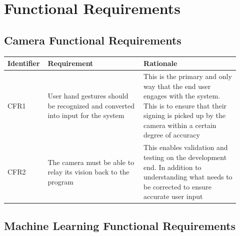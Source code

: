 \documentclass[12pt]{article}
\begin{document}
\section{Functional Requirements}
\subsection{Camera Functional Requirements}

\renewcommand{\arraystretch}{1.2}
\noindent \begin{tabularx}{\textwidth}{p{0.12\linewidth}|p{0.4\linewidth}|p{0.4\linewidth}}
\toprule
\textbf{Identifier} & \textbf{Requirement} & \textbf{Rationale}\\
\midrule
CFR1 
& User hand gestures should be recognized and converted into input for the system 
& This is the primary and only way that the end user engages with the system. This is to ensure that 
their signing is picked up by the camera within a certain degree of accuracy\\
\hline
CFR2
& The camera must be able to relay its vision back to the program
& This enables validation and testing on the development end. In addition to understanding what needs 
to be corrected to ensure accurate user input\\
\bottomrule
\end{tabularx}

\subsection{Machine Learning Functional Requirements}
\end{document}
